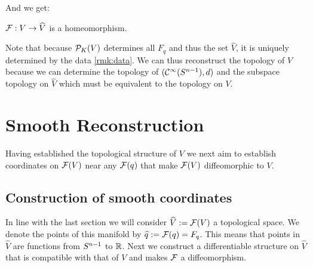 

    

And we get:
\begin{corollary}\label{cor:Fhomeo}
    $\mathcal{F}:V\to \widehat{V}$ is a homeomorphism.
\end{corollary}

Note that because ${\mathcal{P}}_K(V)$ determines all $F_q$ and thus the set $\widehat{V}$, it is uniquely determined by the data \ref{rmk:data}. We can thus reconstruct the topology of $V$ because we can determine the topology of $({\mathcal{C}}^\infty({S^{n-1}}),d)$ and the subspace topology on $\widehat{V}$ which must be equivalent to the topology on $V$.

\section{Smooth Reconstruction}
Having established the topological structure of $V$ we next aim to establish coordinates on $\mathcal{F}(V)$ near any $\mathcal{F}(q)$ that make $\mathcal{F}(V)$ diffeomorphic to $V$.

\subsection{Construction of smooth coordinates}
In line with the last section we will consider $\widehat{V}:={\mathcal{F}}(V)$ a topological space. We denote the points of this manifold by $\widehat{q}:={\mathcal{F}}(q)=F_q$. This means that points in $\widehat{V}$ are functions from ${S^{n-1}}$ to $\mathbb{R}$.
Next we construct a differentiable structure on $\widehat{V}$ that is compatible with that of $V$ and makes $\mathcal{F}$ a diffeomorphism.

